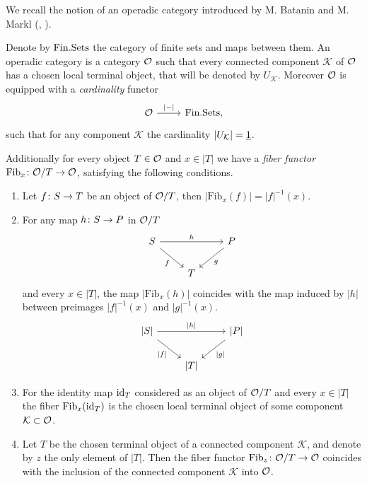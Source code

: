 \documentclass[letterpaper,12pt,leqno]{article}
\numberwithin{equation}{theorem}
\def\Fib{\mathrm{Fib}}
\def\K{\mathcal{K}}
\begin{document}
\begin{nparagraph}
We recall the notion of an operadic category introduced by M. Batanin and M. Markl (\cite{Bat-Markl-1}, \cite{Bat-Markl}).

Denote by $\mathrm{Fin.Sets}$ the category of finite sets and maps between them. An operadic category is a category $\mathcal{O}$ such that every connected component $\mathcal{K}$ of $\mathcal{O}$ has a chosen local terminal object, that will be denoted by $U_\K$.
Moreover $\mathcal{O}$ is equipped with a {\em cardinality} functor
$$
\begin{tikzcd}
\O \ar[r, "|-|"] & \FSets,
\end{tikzcd}
$$
such that for any component $\K$ the cardinality $|U_\K| = \ul{1}$.

Additionally for every object $T \in \mathcal{O}$ and $x \in |T|$ we have a {\em fiber functor} $\Fib_x \from \O / T \to \O$, satisfying the following conditions.
\begin{enumerate}[label=\alph*)]
\item Let $f\colon S \to T$ be an object of $\mathcal{O} / T$, then $|\Fib_x(f)| = |f|^{-1}(x)$.
\item For any map $h\colon S \to P$ in $\mathcal{O} / T$
$$
\begin{tikzcd}
S \ar[dr, "f"'] \ar[rr, "h"] && P \ar[dl, "g"] \\
& T &
\end{tikzcd}
$$
and every $x \in |T|$, the map $|\Fib_x(h)|$ coincides with the map induced by $|h|$ between preimages $|f|^{-1}(x)$ and $|g|^{-1}(x)$.
$$
\begin{tikzcd}
{|S|} \ar[dr, "|f|"'] \ar[rr, "|h|"] && {|P|} \ar[dl, "|g|"] \\
& {|T|} &
\end{tikzcd}
$$
\item For the identity map $\mathrm{id}_T$ considered as an object of $\mathcal{O} / T$ and every $x \in |T|$ the fiber $\Fib_x(\id_T)$ is the chosen local terminal object of some component $\K \subset \O$.
\item Let $T$ be the chosen terminal object of a connected component $\K$, and denote by $z$ the only element of $|T|$. Then the fiber functor $\Fib_z \from \O / T \to \O$ coincides with the
inclusion of the connected component $\K$ into $\mathcal{O}$.


\end{enumerate}
\end{nparagraph}
\end{document}

